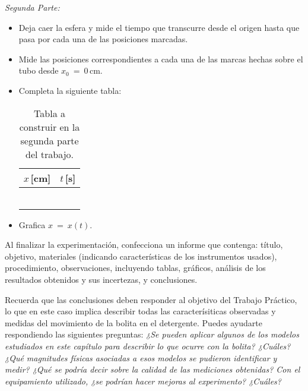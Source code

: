 \noindent
\textit{Segunda Parte:}
\begin{itemize}
  \item Deja caer la esfera y mide el tiempo que transcurre desde el origen hasta que pasa por cada una de las posiciones marcadas.
  \item Mide las posiciones correspondientes a cada una de las marcas hechas sobre el tubo desde $x_0 \ = \ 0$\,cm.
  \item Completa la siguiente tabla:
  \begin{table}[!htb]
    \centering
    \label{tab:xvst}
    \begin{tabular}{|c|c|}
    \hline
    $x$\,[cm]                & $t$\,[s]                \\ \hline
                           &                       \\ \hline
                           &                       \\ \hline
                           &                       \\ \hline
                           &                       \\ \hline
                           &                       \\ \hline
    \multicolumn{1}{|l|}{} & \multicolumn{1}{l|}{} \\ \hline
    \end{tabular}
    \caption{Tabla a construir en la segunda parte del trabajo.}
  \end{table}
  \item Grafica $x \ = \ x(t)$.
 
  \end{itemize}


   
  Al finalizar la experimentación, confecciona un informe que contenga: título, objetivo, materiales  (indicando características de los instrumentos usados), procedimiento, observaciones, incluyendo tablas, gráficos, análisis de los resultados obtenidos y sus incertezas, y conclusiones.

  Recuerda que las conclusiones deben responder al objetivo del Trabajo Práctico, lo que en este caso implica describir todas las caracterísiticas observadas y medidas del movimiento de la bolita en el detergente. Puedes ayudarte respondiendo las siguientes preguntas: {\it ¿Se pueden aplicar algunos de los modelos estudiados en este capítulo para describir lo que ocurre con la bolita? ¿Cuáles? ¿Qué magnitudes físicas asociadas a esos modelos se pudieron identificar y medir? ¿Qué se podría decir sobre la calidad de las mediciones obtenidas? Con el equipamiento utilizado, ¿se podrían hacer mejoras al experimento? ¿Cuáles?}
